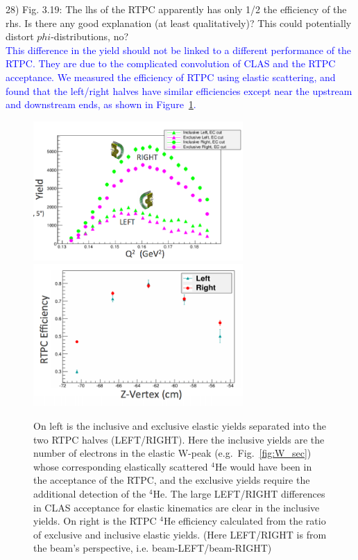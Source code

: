 28) Fig. 3.19:  The lhs of the RTPC apparently has only 1/2 the efficiency of the 
rhs. Is there any good explanation (at least qualitatively)? This could 
potentially distort $phi$-distributions, no? \\
\textcolor{blue}{ 
   This difference in the yield should not be linked to a different performance 
   of the RTPC.  They are due to the complicated convolution of CLAS and the 
   RTPC acceptance.  We measured the efficiency of RTPC using elastic 
scattering, and found that the left/right halves have similar efficiencies 
except near the upstream and downstream ends, as shown in 
Figure~\ref{fig:tpceff}.} \\

\begin{figure}[tbp]\centering
  \includegraphics[width=8cm]{fig/tpceffyields.png}
  \includegraphics[width=8cm]{fig/tpceff.png}
  \caption{On left is the inclusive and exclusive elastic yields separated into 
     the two RTPC halves (LEFT/RIGHT).  Here the inclusive yields are the 
     number of electrons in the elastic W-peak (e.g.\ Fig.~\ref{fig:W_sec}) 
     whose corresponding elastically scattered $^4$He would have been in the 
     acceptance of the RTPC, and the exclusive yields require the additional 
     detection of the $^4$He.  The large LEFT/RIGHT differences in CLAS 
     acceptance for elastic kinematics are clear in the inclusive yields.  On 
     right is the RTPC $^4$He efficiency calculated from the ratio of exclusive 
     and inclusive elastic yields.  (Here LEFT/RIGHT is from the beam's 
     perspective, i.e.  beam-LEFT/beam-RIGHT)\label{fig:tpceff}}
\end{figure}

